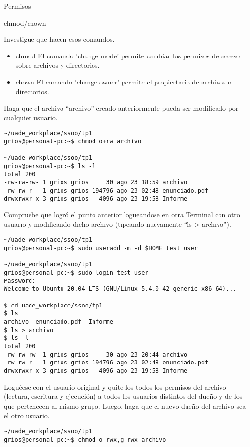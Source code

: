 \begin{section}{Permisos}
\begin{subsection}{chmod/chown}
\begin{quoting}
Investigue que hacen esos comandos.
\end{quoting}
\begin{itemize}
\item chmod
El comando 'change mode' permite cambiar los permisos de acceso sobre archivos y directorios. 
\item chown
El comando 'change owner' permite el propiertario de archivos o directorios.  
\end{itemize}

\begin{quoting}
Haga que el archivo “archivo” creado anteriormente pueda ser modificado por cualquier usuario.
\end{quoting}
\begin{lstlisting}[style=Ubuntu]
~/uade_workplace/ssoo/tp1
grios@personal-pc:~$ chmod o+rw archivo

~/uade_workplace/ssoo/tp1
grios@personal-pc:~$ ls -l             
total 200
-rw-rw-rw- 1 grios grios     30 ago 23 18:59 archivo
-rw-rw-r-- 1 grios grios 194796 ago 23 02:48 enunciado.pdf
drwxrwxr-x 3 grios grios   4096 ago 23 19:58 Informe
\end{lstlisting}

\begin{quoting}
Compruebe que logró el punto anterior logueandose en otra Terminal con otro usuario y
modificando dicho archivo (tipeando nuevamente “ls > archivo”).
\end{quoting}
\begin{lstlisting}[style=Ubuntu]
~/uade_workplace/ssoo/tp1
grios@personal-pc:~$ sudo useradd -m -d $HOME test_user

~/uade_workplace/ssoo/tp1
grios@personal-pc:~$ sudo login test_user
Password: 
Welcome to Ubuntu 20.04 LTS (GNU/Linux 5.4.0-42-generic x86_64)...

$ cd uade_workplace/ssoo/tp1
$ ls 
archivo  enunciado.pdf	Informe
$ ls > archivo
$ ls -l 
total 200
-rw-rw-rw- 1 grios grios     30 ago 23 20:44 archivo
-rw-rw-r-- 1 grios grios 194796 ago 23 02:48 enunciado.pdf
drwxrwxr-x 3 grios grios   4096 ago 23 19:58 Informe

\end{lstlisting}

\begin{quoting}
Loguéese con el usuario original y quite los todos los permisos del archivo (lectura, escritura y
ejecución) a todos los usuarios distintos del dueño y de los que pertenecen al mismo grupo. Luego, haga que
el nuevo dueño del archivo sea el otro usuario.
\end{quoting}
\begin{lstlisting}[style=Ubuntu]
~/uade_workplace/ssoo/tp1
grios@personal-pc:~$ chmod o-rwx,g-rwx archivo


\end{lstlisting}
\end{subsection}
\end{section}
